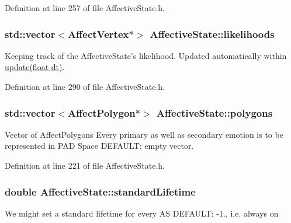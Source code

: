 \-Definition at line 257 of file \-Affective\-State.\-h.

\hypertarget{class_affective_state_a7dedd88cae5c125dfedaaf2eb48ae01f}{
\subsubsection[{likelihoods}]{\setlength{\rightskip}{0pt plus 5cm}std\-::vector$<${\bf \-Affect\-Vertex}$\ast$$>$ {\bf \-Affective\-State\-::likelihoods}}}
\label{class_affective_state_a7dedd88cae5c125dfedaaf2eb48ae01f}
\-Keeping track of the \-Affective\-State's likelihood. \-Updated automatically within \hyperlink{class_affective_state_a82b0f96a1494f5c58a6bec2840f3728a}{update(float dt)}. 

\-Definition at line 290 of file \-Affective\-State.\-h.

\hypertarget{class_affective_state_ac2ea3391ebe5fd5708aecb2acdb7fe0d}{
\subsubsection[{polygons}]{\setlength{\rightskip}{0pt plus 5cm}std\-::vector$<${\bf \-Affect\-Polygon}$\ast$$>$ {\bf \-Affective\-State\-::polygons}}}
\label{class_affective_state_ac2ea3391ebe5fd5708aecb2acdb7fe0d}
\-Vector of \-Affect\-Polygons \-Every primary as well as secondary emotion is to be represented in \-P\-A\-D \-Space \-D\-E\-F\-A\-U\-L\-T\-: empty vector. 

\-Definition at line 221 of file \-Affective\-State.\-h.

\hypertarget{class_affective_state_a081f3fff485d06a746b1b472adf3160c}{
\subsubsection[{standard\-Lifetime}]{\setlength{\rightskip}{0pt plus 5cm}double {\bf \-Affective\-State\-::standard\-Lifetime}}}
\label{class_affective_state_a081f3fff485d06a746b1b472adf3160c}
\-We might set a standard lifetime for every \-A\-S \-D\-E\-F\-A\-U\-L\-T\-: -\/1., i.\-e. always on 

